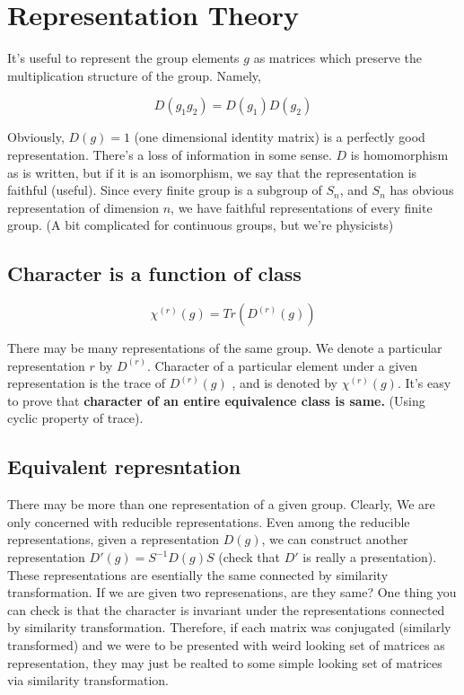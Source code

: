 \documentclass{report}
\begin{document}
\section{Representation Theory}

It's useful to represent the group elements $g$ as matrices which preserve the multiplication structure of the group. Namely,

$$D(g_1 g_2) = D(g_1)D(g_2)$$

\noindent Obviously, $D(g) = 1$ (one dimensional identity matrix) is a perfectly good representation. There's a loss of information in some sense. $D$ is homomorphism as is written, but if it is an isomorphism, we say that the representation is faithful (useful). Since every finite group is a subgroup of $S_n$, and $S_n$ has obvious representation of dimension $n$, we have faithful representations of every finite group. (A bit complicated for continuous groups, but we're physicists)

\subsection{Character is a function of class}

$$\chi^{(r)}(g) = Tr(D^{(r)}(g))$$

\noindent There may be many representations of the same group. We denote a particular representation $r$ by $D^{(r)}$. Character of a particular element under a given representation is the trace of $D^{(r)}(g)$ , and is denoted by $\chi^{(r)}(g)$. It's easy to prove that \textbf{character of an entire equivalence class is same.} (Using cyclic property of trace).

\subsection{Equivalent represntation} 

There may be more than one representation of a given group. Clearly, We are only concerned with reducible representations. Even among the reducible representations, given a representation $D(g)$, we can construct another representation $D'(g) = S^{-1} D(g) S$ (check that $D'$ is really a presentation). These representations are esentially the same connected by similarity transformation. If we are given two represenations, are they same? One thing you can check is that the character is invariant under the representations connected by similarity transformation. Therefore, if each matrix was conjugated (similarly transformed) and we were to be presented with weird looking set of matrices as representation, they may just be realted to some simple looking set of matrices via similarity transformation.\\
\end{document}

